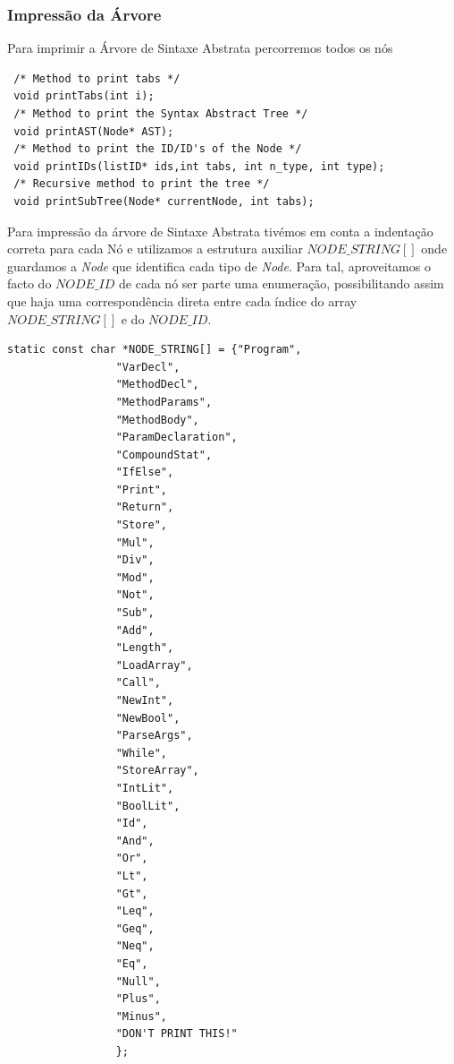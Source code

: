 \documentclass[12pt]{article}
\begin{document}
 \subsubsection{Impressão da Árvore}
 Para imprimir a Árvore de Sintaxe Abstrata percorremos todos os nós 
 \begin{lstlisting}
 /* Method to print tabs */
 void printTabs(int i);
 /* Method to print the Syntax Abstract Tree */
 void printAST(Node* AST);
 /* Method to print the ID/ID's of the Node */
 void printIDs(listID* ids,int tabs, int n_type, int type);
 /* Recursive method to print the tree */
 void printSubTree(Node* currentNode, int tabs);
 \end{lstlisting}
 
 Para impressão da árvore de Sintaxe Abstrata tivémos em conta a indentação correta para cada Nó e utilizamos a estrutura auxiliar $NODE\_STRING[ ]$ onde guardamos a \emph{Node} que identifica cada tipo de \emph{Node}. Para tal, aproveitamos o facto do $NODE\_ID$ de cada nó ser parte uma enumeração, possibilitando assim que haja uma correspondência direta entre cada índice do array $NODE\_STRING[ ]$ e do $NODE\_ID$. 
 
 \begin{lstlisting}
static const char *NODE_STRING[] = {"Program",
                 "VarDecl",
                 "MethodDecl",
                 "MethodParams",
                 "MethodBody",
                 "ParamDeclaration",
                 "CompoundStat",
                 "IfElse",
                 "Print",
                 "Return",
                 "Store",
                 "Mul",
                 "Div",
                 "Mod",
                 "Not",
                 "Sub",
                 "Add",
                 "Length",
                 "LoadArray",
                 "Call",
                 "NewInt",
                 "NewBool",
                 "ParseArgs",
                 "While",
                 "StoreArray",
                 "IntLit",
                 "BoolLit",
                 "Id",
                 "And",
                 "Or",
                 "Lt",
                 "Gt",
                 "Leq",
                 "Geq",
                 "Neq",
                 "Eq",
                 "Null",
                 "Plus",
                 "Minus",
                 "DON'T PRINT THIS!"
                 }; 
 \end{lstlisting} 
 
\end{document}
